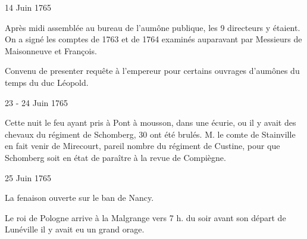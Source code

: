                      \begin{diary}{14 Juin 1765}{}

                         Après midi assemblée au bureau de l'aumône
                              publique, les
                           9 directeurs y étaient. On a signé
                           les comptes de 1763 et de 1764 examinés auparavant
                           par Messieurs
                           de Maisonneuve et François. \bigskip


                         Convenu de presenter requête à l'empereur pour
                           certains ouvrages d'aumônes du temps du duc Léopold. \bigskip


                     \end{diary}
                     \begin{diary}{23 - 24 Juin 1765}{}

                         Cette nuit le feu ayant pris à Pont à
                              mousson, dans
                           une écurie, ou il y avait des chevaux du régiment
                              de Schomberg, 30 ont été brulés. M. le comte de
                              Stainville en fait venir de Mirecourt, pareil
                           nombre du régiment de Custine, pour que Schomberg soit
                           en état de paraître à la revue de Compiègne. \bigskip


                     \end{diary}

                     \begin{diary}{25 Juin 1765}{}

                         La fenaison ouverte sur le ban de
                              Nancy. \bigskip



                           Le roi de Pologne arrive à la
                              Malgrange vers 7 h. du
                           soir avant son départ de Lunéville il y avait eu
                           un grand orage. \bigskip


                     \end{diary}

